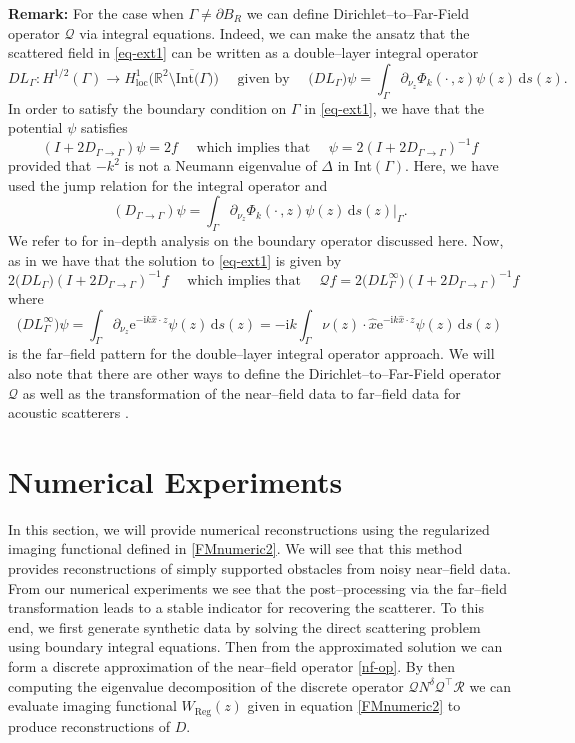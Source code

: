 \documentclass{article}
\newcommand{\R}{\mathbb{R}}
\newcommand{\dnuz}{\partial_{\nu_z}}
\numberwithin{equation}{section}
\begin{document}
{\color{black} {\bf Remark:} For the case when $\Gamma \neq \partial B_R$ we can define Dirichlet--to--Far-Field operator $\mathcal{Q}$ via integral equations. Indeed, we can make the ansatz that the scattered field in \eqref{eq-ext1} can be written as a double--layer integral operator 
$$DL_{\Gamma}: H^{1/2}(\Gamma) \longrightarrow H^1_{\text{loc}} \big(\R^2 \setminus\overline{\text{Int}(\Gamma}) \big)\quad \text{ given by } \quad \big(DL_{\Gamma}\big) \psi = \int_{\Gamma} \dnuz \Phi_k( \cdot \, ,  z ) \psi (z) \, \text{d}s(z).$$
In order to satisfy the boundary condition on $\Gamma$ in \eqref{eq-ext1}, we have that the potential $\psi$ satisfies
$$(I+ 2D_{\Gamma \to \Gamma})\psi=2f \quad \text{ which implies that } \quad \psi = 2(I+ 2D_{\Gamma \to \Gamma})^{-1}f$$
provided that $-k^2$ is not a Neumann eigenvalue of $\Delta$ in Int$(\Gamma)$. Here, we have used the jump relation for the integral operator and 
$$(D_{\Gamma \to \Gamma})\psi = \int_{\Gamma} \dnuz \Phi_k( \cdot \, ,  z ) \psi (z) \, \text{d}s(z)\Big|_{\Gamma}.$$
We refer to \cite{coltonkress,mclean} for in--depth analysis on the boundary operator discussed here. Now, as in \cite{DSM-BH24} we have that the solution to \eqref{eq-ext1} is given by 
$$ 2\big(DL_{\Gamma}\big)(I+ 2D_{\Gamma \to \Gamma})^{-1} f \quad \text{ which implies that } \quad \mathcal{Q} f= 2\big(DL^{\infty}_{\Gamma}\big)(I+ 2D_{\Gamma \to \Gamma})^{-1}f$$
where 
$$\big(DL^{\infty}_{\Gamma}\big) \psi =  \int_{\Gamma} \dnuz \text{e}^{-\text{i}k\hat{x}\cdot z}  \psi(z) \, \text{d}s(z)= -\text{i}k \int_{\Gamma} \nu(z)\cdot \hat{x} \text{e}^{-\text{i}k\hat{x}\cdot z}  \psi(z) \, \text{d}s(z)$$ 
is the far--field pattern for the double--layer integral operator approach. We will also note that there are other ways to define the 
Dirichlet--to--Far-Field operator $\mathcal{Q}$ as well as the transformation of the near--field data to far--field data for acoustic scatterers \cite[Lemma 2.13]{kirschbook}.


\section{Numerical Experiments}\label{numerics}
In this section, we will provide numerical reconstructions using the regularized imaging functional defined in \eqref{FMnumeric2}. We will see that this method provides reconstructions of simply supported obstacles from noisy near--field data. From our numerical experiments we see that the post--processing via the far--field transformation leads to a stable indicator for recovering the scatterer. To this end, we first generate synthetic data by solving the direct scattering problem using boundary integral equations. Then from the approximated solution we can form a discrete approximation of the near--field operator \eqref{nf-op}. By then computing the eigenvalue decomposition of the discrete operator $\mathcal{Q}N^\delta\mathcal{Q}^\top\mathcal{R}$ we can evaluate imaging functional $W_{\mathrm{Reg}}(z)$ given in equation \eqref{FMnumeric2} to produce reconstructions of $D$.


}
\end{document}

